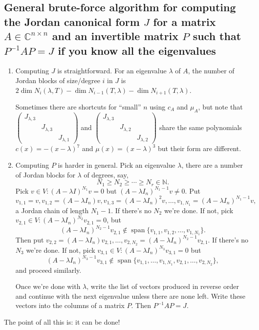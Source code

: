 \documentclass[a4paper]{article}
\newcommand{\spanset}{\operatorname{span}}
\theoremstyle{definition}
\begin{document}
\subsection{General brute-force algorithm for computing the Jordan canonical form $J$ for a matrix $A\in \mathbb C^{n\times n}$ and an invertible matrix $P$ such that $P^{-1}AP=J$ if you know all the eigenvalues}
\begin{enumerate}
    \item Computing $J$ is straightforward. For an eigenvalue $\lambda$ of $A$, the number of Jordan blocks of size/degree $i$ in $J$ is $2\dim N_i(\lambda,T)-\dim N_{i-1}(T,\lambda)-\dim N_{i+1}(T,\lambda)$.
    
    Sometimes there are shortcuts for ``small'' $n$ using $c_{A}$ and $\mu_{A}$, but note that $\begin{pmatrix}J_{\lambda,3}&&\\ & J_{\lambda,3} & \\ & & J_{\lambda,1} \end{pmatrix}$ and $\begin{pmatrix}J_{\lambda,3}&&\\ & J_{\lambda,2} & \\ & & J_{\lambda,2} \end{pmatrix}$ share the same polynomials $c(x)=-(x-\lambda)^7$ and $\mu(x)=(x-\lambda)^3$ but their form are different.
    
    \item Computing $P$ is harder in general. Pick an eigenvalue $\lambda$, there are a number of Jordan blocks for $\lambda$ of degrees, say,
\[
N_1\geq N_2\geq \cdots \geq N_r \in \mathbb N .
\]
Pick $v\in V : (A-\lambda I)^{N_1} v=0$ but $(A-\lambda I_n)^{N_1-1}v\neq 0$. Put
\[
v_{1,1}=v, v_{1,2}=(A-\lambda I_n)v, v_{1,3}=(A-\lambda I_n)^2v, \ldots, v_{1,N_1}=(A-\lambda I_n)^{N_1-1}v,
\]
a Jordan chain of length $N_1-1$. If there's no $N_2$ we're done. If not, pick $v_{2,1}\in V:(A-\lambda I_n)^{N_2} v_{2,1}=0$, but
\[
(A-\lambda I_n)^{N_2-1} v_{2,1} \not\in \spanset \{v_{1,1},v_{1,2},\ldots,v_{1,N_1}\}.
\]
Then put $v_{2,2}=(A-\lambda I_n) v_{2,1}, \ldots ,v_{2,N_2}=(A-\lambda I_n)^{N_2-1} v_{2,1}$. If there's no $N_3$ we're done. If not, pick $v_{3,1}\in V:(A-\lambda I_n)^{N_3} v_{3,1}=0$ but
\[
(A-\lambda I_n)^{N_3-1} v_{3,1}\not\in \spanset \{v_{1,1},\ldots,v_{1,N_1},v_{2,1},\ldots,v_{2,N_2}\},
\]
and proceed similarly.
    
    Once we're done with $\lambda$, write the list of vectors produced in reverse order and continue with the next eigenvalue unless there are none left. Write these vectors into the columns of a matrix $P$. Then $P^{-1}AP=J$.
\end{enumerate}
The point of all this is: it can be done!
\end{document}
